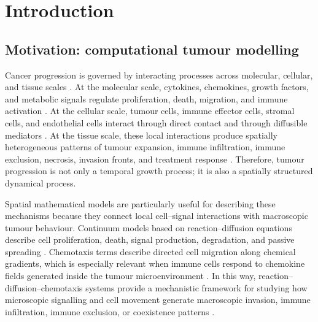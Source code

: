 \documentclass[a4paper,fleqn,longmktitle]{cas-sc}
\theoremstyle{plain}
\theoremstyle{definition}
\numberwithin{equation}{section}
\begin{document}
\maketitle

\section{Introduction}\label{sec:introduction}

\subsection{Motivation: computational tumour modelling}
\label{subsec:motivation-computational-tumour-modelling}

Cancer progression is governed by interacting processes across molecular,
cellular, and tissue scales \cite{beeghly2023measuring,desoyer2025computational}. At the molecular scale, cytokines, chemokines,
growth factors, and metabolic signals regulate proliferation, death, migration,
and immune activation \cite{tiwari2025molecular}. At the cellular scale, tumour cells, immune effector
cells, stromal cells, and endothelial cells interact through direct contact and
through diffusible mediators \cite{kaminska2015role,joshi2026dynamic,he2022extracellular}. 
At the tissue scale, these local interactions produce spatially heterogeneous patterns of tumour expansion, immune infiltration, immune exclusion, necrosis, invasion fronts, and treatment
response \cite{giuliani2025immune,biswas2022inference,liang2026separation}. Therefore, tumour progression is not only a temporal growth process;
it is also a spatially structured dynamical process.

Spatial mathematical models are particularly useful for describing these
mechanisms because they connect local cell--signal interactions with
macroscopic tumour behaviour. 
Continuum models based on reaction--diffusion
equations describe cell proliferation, death, signal production, degradation,
and passive spreading \cite{kondo2010reaction}. 
Chemotaxis terms describe directed cell migration along
chemical gradients, which is especially relevant when immune cells respond to
chemokine fields generated inside the tumour microenvironment \cite{mempel2024chemokines,liu2025bidirectional}. 
In this way, reaction--diffusion--chemotaxis systems provide a mechanistic framework for
studying how microscopic signalling and cell movement generate macroscopic
invasion, immune infiltration, immune exclusion, or coexistence patterns
\cite{matzavinos2004mathematical,tao2024global,wang2026elliptic,li2026global,ai2015reaction,ke2022analysis,kiselev2022chemotaxis}.
\end{document}

